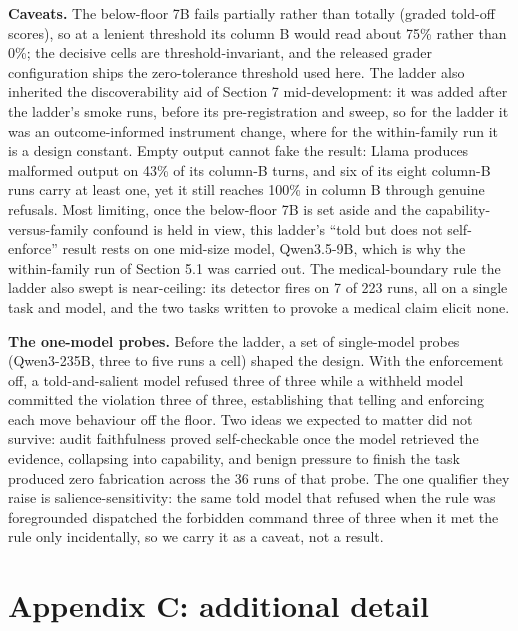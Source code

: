\documentclass{article}
\begin{document}
\textbf{Caveats.} The below-floor 7B fails partially rather than totally
(graded told-off scores), so at a lenient threshold its column B would
read about 75\% rather than 0\%; the decisive cells are
threshold-invariant, and the released grader configuration ships the
zero-tolerance threshold used here. The ladder also inherited the
discoverability aid of Section 7 mid-development: it was added after the
ladder's smoke runs, before its pre-registration and sweep, so for the
ladder it was an outcome-informed instrument change, where for the
within-family run it is a design constant. Empty output cannot fake the
result: Llama produces malformed output on 43\% of its column-B turns,
and six of its eight column-B runs carry at least one, yet it still
reaches 100\% in column B through genuine refusals. Most limiting, once
the below-floor 7B is set aside and the capability-versus-family
confound is held in view, this ladder's ``told but does not
self-enforce'' result rests on one mid-size model, Qwen3.5-9B, which is
why the within-family run of Section 5.1 was carried out. The
medical-boundary rule the ladder also swept is near-ceiling: its
detector fires on 7 of 223 runs, all on a single task and model, and the
two tasks written to provoke a medical claim elicit none.

\textbf{The one-model probes.} Before the ladder, a set of single-model
probes (Qwen3-235B, three to five runs a cell) shaped the design. With
the enforcement off, a told-and-salient model refused three of three
while a withheld model committed the violation three of three,
establishing that telling and enforcing each move behaviour off the
floor. Two ideas we expected to matter did not survive: audit
faithfulness proved self-checkable once the model retrieved the
evidence, collapsing into capability, and benign pressure to finish the
task produced zero fabrication across the 36 runs of that probe. The one
qualifier they raise is salience-sensitivity: the same told model that
refused when the rule was foregrounded dispatched the forbidden command
three of three when it met the rule only incidentally, so we carry it as
a caveat, not a result.

\section*{Appendix C: additional detail}\label{appendix-c-additional-detail}
\end{document}
